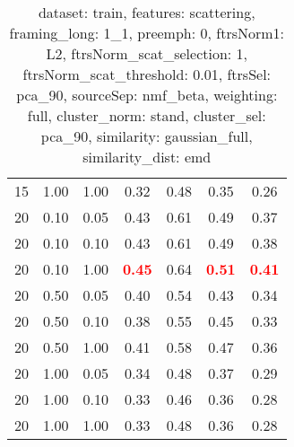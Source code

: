 \begin{table}
\begin{center}
\begin{tabular}{lllcccc}
15 & 1.00 & 1.00 & 0.32 & 0.48 & 0.35 & 0.26 \\ 
20 & 0.10 & 0.05 & 0.43 & 0.61 & 0.49 & 0.37 \\ 
20 & 0.10 & 0.10 & 0.43 & 0.61 & 0.49 & 0.38 \\ 
20 & 0.10 & 1.00 & \textbf{\textcolor{red}{0.45}} & 0.64 & \textbf{\textcolor{red}{0.51}} & \textbf{\textcolor{red}{0.41}} \\ 
20 & 0.50 & 0.05 & 0.40 & 0.54 & 0.43 & 0.34 \\ 
20 & 0.50 & 0.10 & 0.38 & 0.55 & 0.45 & 0.33 \\ 
20 & 0.50 & 1.00 & 0.41 & 0.58 & 0.47 & 0.36 \\ 
20 & 1.00 & 0.05 & 0.34 & 0.48 & 0.37 & 0.29 \\ 
20 & 1.00 & 0.10 & 0.33 & 0.46 & 0.36 & 0.28 \\ 
20 & 1.00 & 1.00 & 0.33 & 0.48 & 0.36 & 0.28 \\ 
\end{tabular} 
\end{center} 
\caption{dataset: train, features: scattering, framing\_long: 1\_1, preemph: 0, ftrsNorm1: L2, ftrsNorm\_scat\_selection: 1, ftrsNorm\_scat\_threshold: 0.01, ftrsSel: pca\_90, sourceSep: nmf\_beta, weighting: full, cluster\_norm: stand, cluster\_sel: pca\_90, similarity: gaussian\_full, similarity\_dist: emd} 
\label{datasetrFeaturscFraminlong1_1Preemp0Ftrsnorm1L2Ftrsnoscatselect1Ftrsnoscatthresh0.01Ftrsselpc90SourcesepnmbeWeightfuClustenormstClusteselpc90SimilagafuSimiladistem} 
\end{table} 
 
